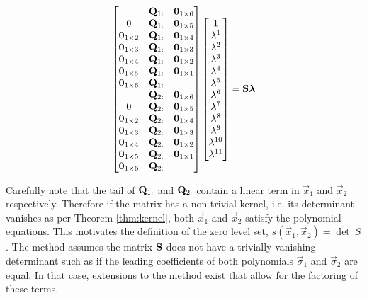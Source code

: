 \documentclass[oneside, 11pt]{book}
\begin{document}
\begin{equation}
    \begin{bmatrix}
        & \mathbf{Q}_{1:} & \bm{0}_{1\times 6} \\
        0 & \mathbf{Q}_{1:} & \bm{0}_{1\times 5} \\
        \bm{0}_{1\times 2} & \mathbf{Q}_{1:} & \bm{0}_{1\times 4} \\
        \bm{0}_{1\times 3} & \mathbf{Q}_{1:} & \bm{0}_{1\times 3} \\
        \bm{0}_{1\times 4} & \mathbf{Q}_{1:} & \bm{0}_{1\times 2} \\
        \bm{0}_{1\times 5} & \mathbf{Q}_{1:} & \bm{0}_{1\times 1} \\
        \bm{0}_{1\times 6} & \mathbf{Q}_{1:} & \\
        & \mathbf{Q}_{2:} & \bm{0}_{1\times 6} \\
        0 & \mathbf{Q}_{2:} & \bm{0}_{1\times 5} \\
        \bm{0}_{1\times 2} & \mathbf{Q}_{2:} & \bm{0}_{1\times 4} \\
        \bm{0}_{1\times 3} & \mathbf{Q}_{2:} & \bm{0}_{1\times 3} \\
        \bm{0}_{1\times 4} & \mathbf{Q}_{2:} & \bm{0}_{1\times 2} \\
        \bm{0}_{1\times 5} & \mathbf{Q}_{2:} & \bm{0}_{1\times 1} \\
        \bm{0}_{1\times 6} & \mathbf{Q}_{2:} & \\
    \end{bmatrix}
    \begin{bmatrix}
        1 \\
        \lambda^1 \\
        \lambda^2 \\
        \lambda^3 \\
        \lambda^4 \\
        \lambda^5 \\
        \lambda^6 \\
        \lambda^7 \\
        \lambda^8 \\
        \lambda^9 \\
        \lambda^{10} \\
        \lambda^{11}
    \end{bmatrix}
    =
    \mathbf{S}\bm{\lambda}
    \label{eqn:inhomog_poly}
\end{equation}

Carefully note that the tail of $\mathbf{Q}_{1:}$ and $\mathbf{Q}_{2:}$ contain a linear term in $\vec{x}_1$ and $\vec{x}_2$ respectively. Therefore if the matrix has a non-trivial kernel, i.e. its determinant vanishes as per Theorem \ref{thm:kernel}, both $\vec{x}_1$ and $\vec{x}_2$ satisfy the polynomial equations. This motivates the definition of the zero level set, $s(\vec{x}_1, \vec{x}_2) = \det~S$. The method assumes the matrix $\mathbf{S}$ does not have a trivially vanishing determinant such as if the leading coefficients of both polynomials $\vec{\sigma}_1$ and $\vec{\sigma}_2$ are equal. In that case, extensions to the method exist that allow for the factoring of these terms\cite{Sederberg84}.
\end{document}
